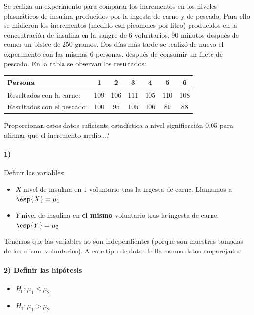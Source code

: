 \pagebreak
\begin{problem}[6]
Se realiza un experimento para comparar los incrementos en los niveles plasmáticos de insulina producidos por la ingesta de carne y de pescado. Para ello se midieron los incrementos (medido esn picomoles por litro) producidos en la concentración de insulina en la sangre de 6 voluntarios, 90 minutos después de comer un bistec de 250 gramos. Dos días más tarde se realizó de nuevo el experimento con las mismas 6 personas, después de consumir un filete de pescado. En la tabla se observan los resultados:

\begin{tabular} {|l|c|c|c|c|c|c|}
\hline
Persona & 1 & 2 & 3 & 4 & 5 & 6\\
\hline
Resultados con la carne: & 109& 106 & 111& 105 & 110 & 108\\
\hline
Resultados con el pescado: & 100& 95& 105& 106& 80& 88\\
\hline
\end{tabular}

\ppart Proporcionan estos datos suficiente estadística a nivel significación 0.05 para afirmar que el incremento medio...?
\solution

\spart 

\paragraph{1)} Definir las variables:
\begin{itemize}
\item $X$ nivel de insulina en 1 voluntario tras la ingesta de carne. Llamamos a $\esp{X} = \mu_1$
\item $Y$ nivel de insulina en \textbf{el mismo} voluntario tras la ingesta de carne. $\esp{Y} = \mu_2$
\end{itemize}

Tenemos que las variables no son independientes (porque son muestras tomadas de los mismo voluntarios). A este tipo de datos le llamamos datos emparejados 

\paragraph{2) Definir las hipótesis}
\begin{itemize}
\item $H_0: \mu_1 \leq \mu_2$
\item $H_1 : \mu_1>\mu_2$
\end{itemize}


\end{problem}
